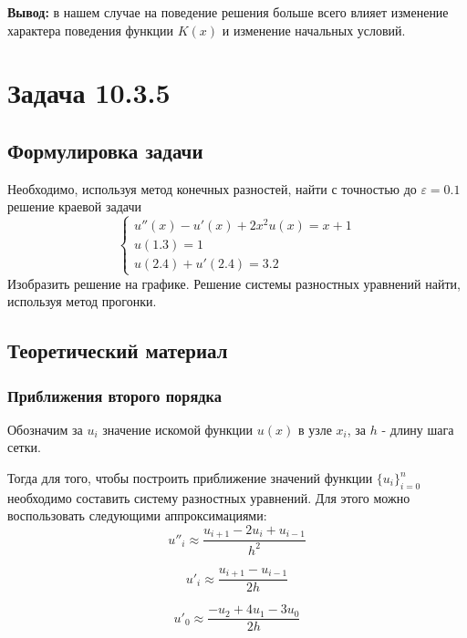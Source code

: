 \documentclass[12pt]{article}%
\begin{document}
\textbf{Вывод:} в нашем случае на поведение решения больше всего влияет изменение характера поведения функции $K(x)$ и изменение начальных условий.

\newpage

\section{Задача 10.3.5}
\subsection{Формулировка задачи}
Необходимо, используя метод конечных разностей, найти с точностью до $\varepsilon=0.1$ решение краевой задачи
\begin{equation*}
    \begin{cases}
        u''(x) - u'(x) + 2x^2 u(x) = x + 1 \\
        u(1.3) = 1 \\
        u(2.4) + u'(2.4) = 3.2
    \end{cases}
\end{equation*}
Изобразить решение на графике. Решение системы разностных уравнений найти, используя метод прогонки.

\subsection{Теоретический материал}
\subsubsection{Приближения второго порядка}
Обозначим за $u_i$ значение искомой функции $u(x)$ в узле $x_i$, за $h$ - длину шага сетки. 

Тогда для того, чтобы построить приближение значений функции $\{u_i\}^n_{i=0}$ необходимо составить систему разностных уравнений. Для этого можно воспользовать следующими аппроксимациями:
\begin{equation}\label{theor-d2-approx}
    u''_{i} \approx \frac{u_{i + 1} - 2 u_i + u_{i-1}}{h^2}
\end{equation}

\begin{equation}\label{theor-d1-approx}
    u'_i\approx \frac{u_{i+1} - u_{i-1}}{2h}    
\end{equation}

\begin{equation}\label{theor-d1-lower-bound}
    u'_{0} \approx \frac{-u_2 + 4u_1 - 3u_0}{2h}
\end{equation}
\end{document}

